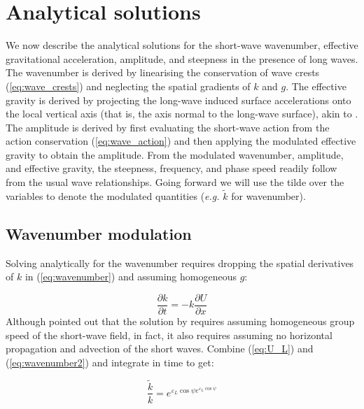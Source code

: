 \documentclass[lineno]{jfm}
\begin{document}
\section{Analytical solutions}
\label{section:analytical_solutions}

We now describe the analytical solutions for the short-wave wavenumber,
effective gravitational acceleration, amplitude, and steepness in the presence
of long waves.
The wavenumber is derived by linearising the conservation of wave crests
(\ref{eq:wave_crests}) and neglecting the spatial gradients of $k$ and $g$.
The effective gravity is derived by projecting the long-wave induced surface
accelerations onto the local vertical axis (that is, the axis normal to the
long-wave surface), akin to \citet{zhang1990evolution}.
The amplitude is derived by first evaluating the short-wave action from the
action conservation (\ref{eq:wave_action}) and then applying the modulated
effective gravity to obtain the amplitude.
From the modulated wavenumber, amplitude, and effective gravity, the steepness,
frequency, and phase speed readily follow from the usual wave relationships.
Going forward we will use the tilde over the variables to denote the modulated
quantities (\textit{e.g.} $\widetilde{k}$ for wavenumber).

\subsection{Wavenumber modulation}
\label{subsection:wavenumber_modulation}

Solving analytically for the wavenumber requires dropping the spatial derivatives
of $k$ in (\ref{eq:wavenumber}) and assuming homogeneous $g$:

\begin{equation}
\label{eq:wavenumber2}
\dfrac{\partial k}{\partial t}
= - k \dfrac{\partial U}{\partial x}
\end{equation}
Although \citet{peureux2021unsteady} pointed out that the solution by
\citet{longuet1960changes} requires assuming homogeneous group speed of the
short-wave field, in fact, it also requires assuming no horizontal propagation
and advection of the short waves.
Combine (\ref{eq:U_L}) and (\ref{eq:wavenumber2}) and integrate in time to get:

\begin{equation}
\label{eq:k_short_exact}
\frac{\widetilde{k}}{k} = e^{\varepsilon_L \cos{\psi} e^{\varepsilon_L \cos{\psi}}}
\end{equation}
\end{document}
